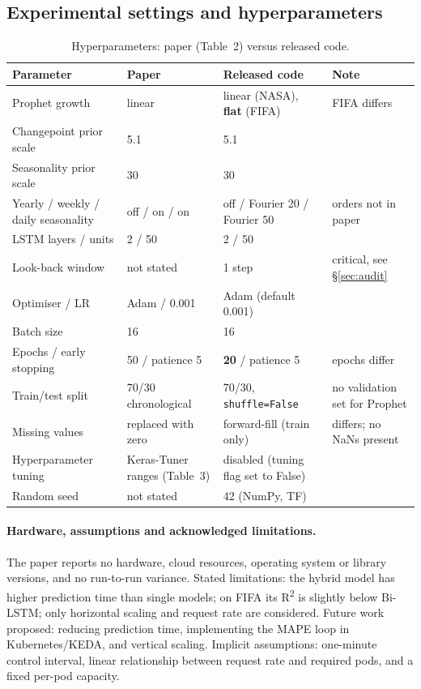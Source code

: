 \documentclass[11pt,a4paper]{article}
\begin{document}
\subsection{Experimental settings and hyperparameters}
\begin{table}[h]\centering\small
\caption{Hyperparameters: paper (Table~2) versus released code.}\label{tab:hp}
\begin{tabularx}{\textwidth}{@{}lLLL@{}}\toprule
Parameter & Paper & Released code & Note\\\midrule
Prophet growth & linear & linear (NASA), \textbf{flat} (FIFA) & FIFA differs \\
Changepoint prior scale & 5.1 & 5.1 & \\
Seasonality prior scale & 30 & 30 & \\
Yearly / weekly / daily seasonality & off / on / on & off / Fourier 20 / Fourier 50 & orders not in paper \\
LSTM layers / units & 2 / 50 & 2 / 50 & \\
Look-back window & not stated & 1 step & critical, see \S\ref{sec:audit}\\
Optimiser / LR & Adam / 0.001 & Adam (default 0.001) & \\
Batch size & 16 & 16 & \\
Epochs / early stopping & 50 / patience 5 & \textbf{20} / patience 5 & epochs differ \\
Train/test split & 70/30 chronological & 70/30, \texttt{shuffle=False} & no validation set for Prophet \\
Missing values & replaced with zero & forward-fill (train only) & differs; no NaNs present\\
Hyperparameter tuning & Keras-Tuner ranges (Table~3) & disabled (tuning flag set to False) & \\
Random seed & not stated & 42 (NumPy, TF) & \\
\bottomrule\end{tabularx}
\end{table}

\paragraph{Hardware, assumptions and acknowledged limitations.}
The paper reports no hardware, cloud resources, operating system or library versions, and no run-to-run variance. Stated limitations: the hybrid model has higher prediction time than single models; on FIFA its R\textsuperscript{2} is slightly below Bi-LSTM; only horizontal scaling and request rate are considered. Future work proposed: reducing prediction time, implementing the MAPE loop in Kubernetes/KEDA, and vertical scaling. Implicit assumptions: one-minute control interval, linear relationship between request rate and required pods, and a fixed per-pod capacity.
\end{document}
